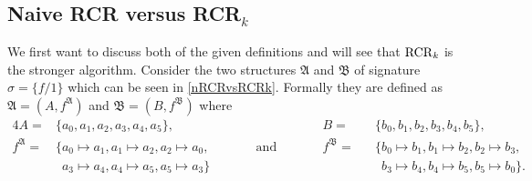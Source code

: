 \subsection{Naive RCR versus RCR$_k$}

We first want to discuss both of the given definitions and will see that $\operatorname{RCR}_k$ is the stronger algorithm.
Consider the two structures $\mathfrak A$ and $\mathfrak B$ of signature $\sigma=\{f/1\}$ which can be seen in \cref{nRCRvsRCRk}.
Formally they are defined as $\mathfrak A=(A,f^{\mathfrak A})$ and $\mathfrak B = (B, f^{\mathfrak B})$ where
\begin{alignat*}{4}
	A=&\{a_0,a_1,a_2,a_3,a_4,a_5\}, &&  && B=&&\{b_0,b_1,b_2,b_3,b_4,b_5\},\\
	f^{\mathfrak A}=&\{a_0\mapsto a_1, a_1\mapsto a_2, a_2\mapsto a_0, && \qquad \text{and} \qquad && f^{\mathfrak B}=&&\{b_0\mapsto b_1, b_1 \mapsto b_2, b_2 \mapsto b_3, \\
	&\phantom{\{} a_3\mapsto a_4, a_4\mapsto a_5, a_5\mapsto a_3 \} &&  && && \phantom{\{} b_3\mapsto b_4, b_4 \mapsto b_5, b_5 \mapsto b_0\}.
\end{alignat*}

